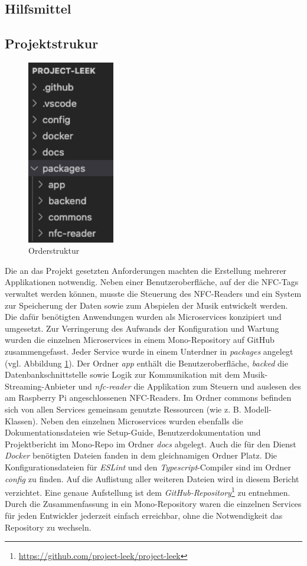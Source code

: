 \documentclass[10pt, a4paper]{article}
\begin{document}
\subsection{Hilfsmittel}
\subsection{Projektstrukur}
\begin{figure}
  \includegraphics[width=3.8cm]{PackageStruktur.png}
  \caption{Orderstruktur}
  \label{fig:Orderstruktur}
\end{figure}
Die an das Projekt gesetzten Anforderungen machten die Erstellung mehrerer Applikationen notwendig. Neben einer Benutzeroberfläche, auf der die NFC-Tags
verwaltet werden können, musste die Steuerung des NFC-Readers und ein System zur Speicherung der Daten sowie zum Abspielen der Musik entwickelt werden.
Die dafür benötigten Anwendungen wurden als Microservices konzipiert und umgesetzt. Zur Verringerung des Aufwands der Konfiguration und Wartung wurden die einzelnen Microservices in einem Mono-Repository auf GitHub zusammengefasst.
Jeder Service wurde in einem Unterdner in \textit{packages} angelegt (vgl. Abbildung \ref{fig:Orderstruktur}). Der Ordner \textit{app} enthält die Benutzeroberfläche,
\textit{backed} die Datenbankschnittstelle sowie Logik zur Kommunikation mit dem Musik-Streaming-Anbieter und \textit{nfc-reader} die Applikation zum Steuern und auslesen des am Raspberry Pi angeschlossenen NFC-Readers.
Im Ordner commons befinden sich von allen Services gemeinsam genutzte Ressourcen (wie z. B. Modell-Klassen).
Neben den einzelnen Microservices wurden ebenfalls die Dokumentationsdateien wie Setup-Guide, Benutzerdokumentation und Projektbericht im Mono-Repo im Ordner \textit{docs} abgelegt.
Auch die für den Dienst \textit{Docker} benötigten Dateien fanden in dem gleichnamigen Ordner Platz. Die Konfigurationsdateien für \textit{ESLint} und den \textit{Typescript}-Compiler sind im Ordner \textit{config} zu finden.
Auf die Auflistung aller weiteren Dateien wird in diesem Bericht verzichtet. Eine genaue Aufstellung ist dem \textit{GitHub-Repository}\footnote{\url{https://github.com/project-leek/project-leek}} zu entnehmen.
Durch die Zusammenfassung in ein Mono-Repository waren die einzelnen Services für jeden Entwickler jederzeit einfach erreichbar, ohne die Notwendigkeit das Repository zu wechseln.
\end{document}
